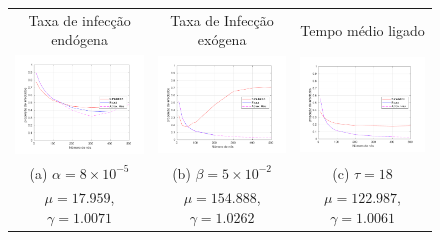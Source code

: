 	\begin{figure}
	    \centering
	    \begin{tabular}{ccc}
	        \hspace{-0.6cm}Taxa de infecção endógena & 
	        \hspace{-0.6cm}Taxa de Infecção exógena & 
	        \hspace{-0.6cm}Tempo médio ligado\\
	        \hspace{-0.6cm}\includegraphics[width=0.35\columnwidth]{img/fig_a_1000_v0_lambda1500_mu17_9593_gamma1_007100_iter_2_rho0_0.pdf} & 
	        \hspace{-0.6cm}\includegraphics[width=0.35\columnwidth]{img/fig_e_2000_v0_lambda1500_mu154_8883_gamma1_026200_iter_2_rho0_0.pdf} &
	        \hspace{-0.6cm}\includegraphics[width=0.35\columnwidth]{img/fig_i_3000_v0_lambda1500_mu122_9877_gamma1_006100_iter_2_rho0_0.pdf}\\
	        (a) $\alpha = 8 \times 10^{-5}$ & 
	        (b) $\beta  = 5 \times 10^{-2}$ & 
	        (c) $\tau   = 18$\\
	        $\mu = 17.959$, $\gamma = 1.0071$ &
            $\mu = 154.888$, $\gamma = 1.0262$ &
            $\mu = 122.987$, $\gamma = 1.0061$\\

\end{tabular}
\end{figure}
